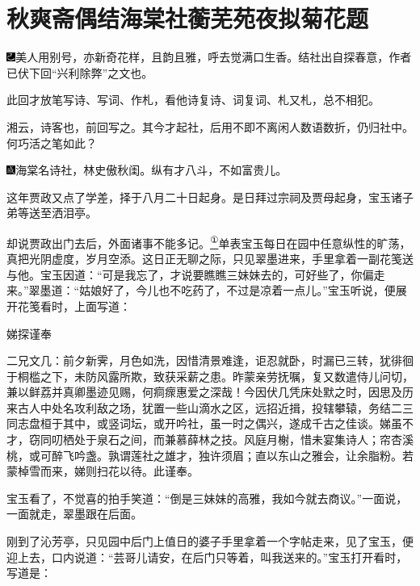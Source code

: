 

\chapter{秋爽斋偶结海棠社\hspace{.5em}蘅芜苑夜拟菊花题}

{\includegraphics[width=3mm]{../Images/00003}美人用别号，亦新奇花样，且韵且雅，呼去觉满口生香。结社出自探春意，作者已伏下回``兴利除弊''之文也。}

{此回才放笔写诗、写词、作札，看他诗复诗、词复词、札又札，总不相犯。}

{湘云，诗客也，前回写之。其今才起社，后用不即不离闲人数语数折，仍归社中。何巧活之笔如此？}

{\includegraphics[width=3mm]{../Images/00005}海棠名诗社，林史傲秋闺。纵有才八斗，不如富贵儿。}

这年贾政又点了学差，择于八月二十日起身。是日拜过宗祠及贾母起身，宝玉诸子弟等送至洒泪亭。

却说贾政出门去后，外面诸事不能多记。\href{../Text/part0041_split_000.html\#lnkback_1_a}{\textsuperscript{①}}单表宝玉每日在园中任意纵性的旷荡，真把光阴虚度，岁月空添。这日正无聊之际，只见翠墨进来，手里拿着一副花笺送与他。宝玉因道：``可是我忘了，才说要瞧瞧三妹妹去的，可好些了，你偏走来。''翠墨道：``姑娘好了，今儿也不吃药了，不过是凉着一点儿。''宝玉听说，便展开花笺看时，上面写道：

娣探谨奉

二兄文几：前夕新霁，月色如洗，因惜清景难逢，讵忍就卧，时漏已三转，犹徘徊于桐槛之下，未防风露所欺，致获采薪之患。昨蒙亲劳抚嘱，复又数遣侍儿问切，兼以鲜荔并真卿墨迹见赐，何痌瘝惠爱之深哉！今因伏几凭床处默之时，因思及历来古人中处名攻利敌之场，犹置一些山滴水之区，远招近揖，投辖攀辕，务结二三同志盘桓于其中，或竖词坛，或开吟社，虽一时之偶兴，遂成千古之佳谈。娣虽不才，窃同叨栖处于泉石之间，而兼慕薛林之技。风庭月榭，惜未宴集诗人；帘杏溪桃，或可醉飞吟盏。孰谓莲社之雄才，独许须眉；直以东山之雅会，让余脂粉。若蒙棹雪而来，娣则扫花以待。此谨奉。

宝玉看了，不觉喜的拍手笑道：``倒是三妹妹的高雅，我如今就去商议。''一面说，一面就走，翠墨跟在后面。

刚到了沁芳亭，只见园中后门上值日的婆子手里拿着一个字帖走来，见了宝玉，便迎上去，口内说道：``芸哥儿请安，在后门只等着，叫我送来的。''宝玉打开看时，写道是：


